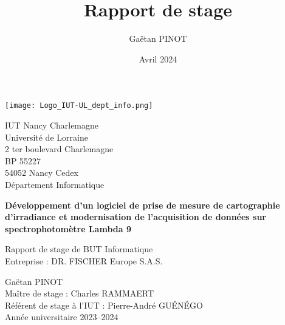 \documentclass[12pt]{article}
\title{\Large\textbf{Rapport de stage}}
\author{Gaëtan PINOT}
\date{Avril 2024}
\begin{document}

\begin{center}
	\texttt{[image: Logo\_IUT-UL\_dept\_info.png]}
\end{center}

\vspace{1cm}

\noindent
{\large
IUT Nancy Charlemagne\\
Université de Lorraine\\
2 ter boulevard Charlemagne\\
BP 55227\\
54052 Nancy Cedex\\[5mm]
Département Informatique
}

\vspace{5cm}

\begin{center}
	{\huge
	\textbf{Développement d'un logiciel de prise de mesure de cartographie d'irradiance et modernisation de l'acquisition de données sur spectrophotomètre Lambda 9}
	}
\end{center}

\vspace{5cm}

{\Large
\noindent
Rapport de stage de BUT Informatique\\
Entreprise : DR. FISCHER Europe S.A.S.
}

\vfill

{\Large
\noindent
Gaëtan PINOT\\
Maître de stage : Charles RAMMAERT\\
Référent de stage à l'IUT : Pierre-André GUÉNÉGO\\
Année universitaire 2023--2024
}
\end{document}

